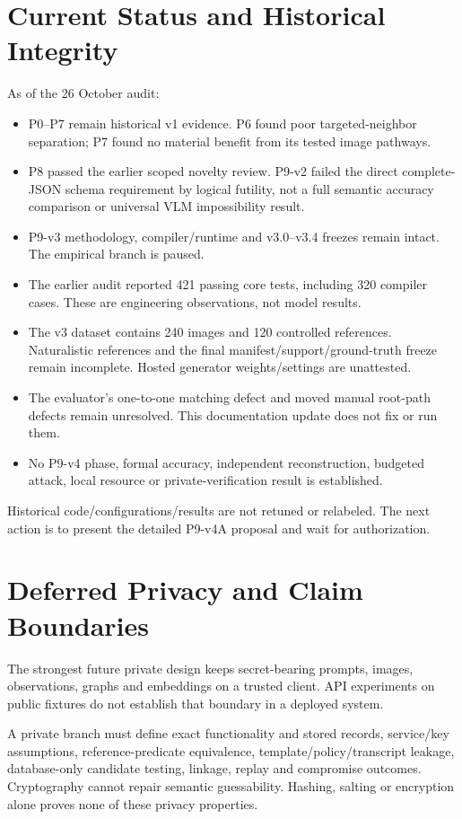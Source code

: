 \documentclass[11pt,a4paper]{article}
\begin{document}
\section{Current Status and Historical Integrity}
As of the 26 October audit:
\begin{itemize}
\item P0--P7 remain historical v1 evidence. P6 found poor targeted-neighbor separation; P7 found no material benefit from its tested image pathways.
\item P8 passed the earlier scoped novelty review. P9-v2 failed the direct complete-JSON schema requirement by logical futility, not a full semantic accuracy comparison or universal VLM impossibility result.
\item P9-v3 methodology, compiler/runtime and v3.0--v3.4 freezes remain intact. The empirical branch is paused.
\item The earlier audit reported 421 passing core tests, including 320 compiler cases. These are engineering observations, not model results.
\item The v3 dataset contains 240 images and 120 controlled references. Naturalistic references and the final manifest/support/ground-truth freeze remain incomplete. Hosted generator weights/settings are unattested.
\item The evaluator's one-to-one matching defect and moved manual root-path defects remain unresolved. This documentation update does not fix or run them.
\item No P9-v4 phase, formal accuracy, independent reconstruction, budgeted attack, local resource or private-verification result is established.
\end{itemize}
Historical code/configurations/results are not retuned or relabeled. The next action is to present the detailed P9-v4A proposal and wait for authorization.

\section{Deferred Privacy and Claim Boundaries}
The strongest future private design keeps secret-bearing prompts, images, observations, graphs and embeddings on a trusted client. API experiments on public fixtures do not establish that boundary in a deployed system.

A private branch must define exact functionality and stored records, service/key assumptions, reference-predicate equivalence, template/policy/transcript leakage, database-only candidate testing, linkage, replay and compromise outcomes. Cryptography cannot repair semantic guessability. Hashing, salting or encryption alone proves none of these privacy properties.
\end{document}
